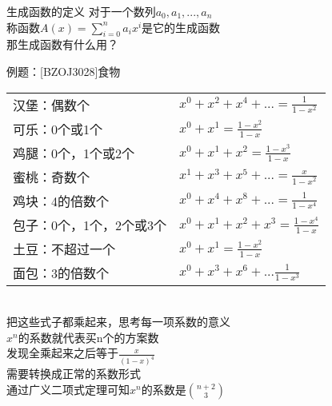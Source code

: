 \documentclass{beamer}
\begin{document}
\begin{frame}{生成函数的定义}
对于一个数列$a_0,a_1,...,a_n$\\
称函数$A(x)=\sum_{i=0}^{n}a_{i}x^{i}$是它的生成函数\\
\pause
那生成函数有什么用？\\
\end{frame}

\begin{frame}{例题：[BZOJ3028]食物}
\scriptsize
\begin{tabular}{ll}
汉堡：偶数个 & $x^0+x^2+x^4+...=\frac{1}{1-x^2}$\\
可乐：0个或1个 & $x^0+x^1=\frac{1-x^2}{1-x}$\\
鸡腿：0个，1个或2个 & $x^0+x^1+x^2=\frac{1-x^3}{1-x}$\\
蜜桃：奇数个 & $x^1+x^3+x^5+...=\frac{x}{1-x^2}$\\
鸡块：4的倍数个 & $x^0+x^4+x^8+...=\frac{1}{1-x^4}$\\
包子：0个，1个，2个或3个 & $x^0+x^1+x^2+x^3=\frac{1-x^4}{1-x}$\\
土豆：不超过一个 & $x^0+x^1=\frac{1-x^2}{1-x}$\\
面包：3的倍数个 & $x^0+x^3+x^6+...\frac{1}{1-x^3}$\\
\end{tabular}\\
\normalsize
{}
\pause
{}
\pause
{}
\pause
把这些式子都乘起来，思考每一项系数的意义\\
\pause
$x^n$的系数就代表买n个的方案数\\
\pause
发现全乘起来之后等于$\frac{x}{(1-x)^4}$\\
需要转换成正常的系数形式\\
通过广义二项式定理可知$x^n$的系数是$\binom{n+2}{3}$
\end{frame}
\end{document}
